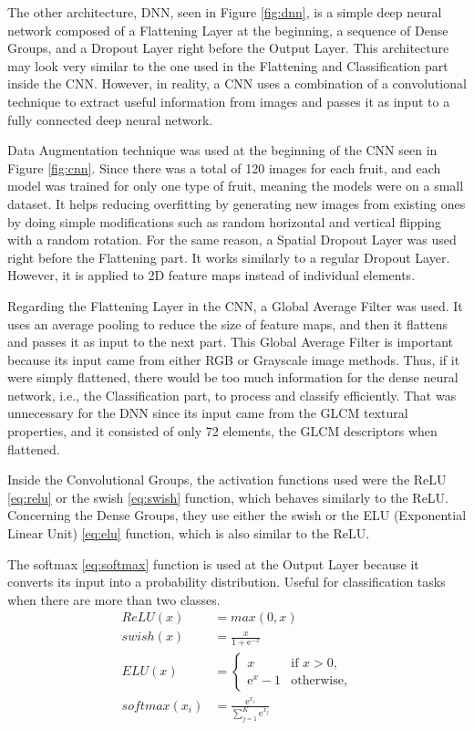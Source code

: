 \documentclass[../main.tex]{subfile}
\begin{document}
    
    
    The other architecture, DNN, seen in Figure \ref{fig:dnn}, is a simple deep neural network composed of a Flattening Layer at the beginning, a sequence of Dense Groups, and a Dropout Layer right before the Output Layer. This architecture may look very similar to the one used in the Flattening and Classification part inside the CNN. However, in reality, a CNN uses a combination of a convolutional technique to extract useful information from images and passes it as input to a fully connected deep neural network.
    
    Data Augmentation technique was used at the beginning of the CNN seen in Figure \ref{fig:cnn}. Since there was a total of 120 images for each fruit, and each model was trained for only one type of fruit, meaning the models were on a small dataset. It helps reducing overfitting by generating new images from existing ones by doing simple modifications such as random horizontal and vertical flipping with a random rotation. For the same reason, a Spatial Dropout Layer was used right before the Flattening part. It works similarly to a regular Dropout Layer. However, it is applied to 2D feature maps instead of individual elements.
    
    Regarding the Flattening Layer in the CNN, a Global Average Filter was used. It uses an average pooling to reduce the size of feature maps, and then it flattens and passes it as input to the next part. This Global Average Filter is important because its input came from either RGB or Grayscale image methods. Thus, if it were simply flattened, there would be too much information for the dense neural network, i.e., the Classification part, to process and classify efficiently. That was unnecessary for the DNN since its input came from the GLCM textural properties, and it consisted of only 72 elements, the GLCM descriptors when flattened.
    
    Inside the Convolutional Groups, the activation functions used were the ReLU \eqref{eq:relu} or the swish \eqref{eq:swish} function, which behaves similarly to the ReLU. Concerning the Dense Groups, they use either the swish or the ELU (Exponential Linear Unit) \eqref{eq:elu} function, which is also similar to the ReLU.

    The softmax \eqref{eq:softmax} function is used at the Output Layer because it converts its input into a probability distribution. Useful for classification tasks when there are more than two classes.
    \begin{align}
        ReLU(x) &= max(0, x) \label{eq:relu} \\
        swish(x) &= \frac{x}{1 + \mathrm{e}^{-x}} \label{eq:swish} \\
        ELU(x) &= 
        \begin{cases}
            x & \mbox{if } x > 0, \\
            \mathrm{e}^{x} - 1 & \mbox{otherwise},
        \end{cases} \label{eq:elu} \\
        softmax(x_{i}) &= \frac{\mathrm{e}^{x_{i}}}{\sum^{K}_{j=1} \mathrm{e}^{x_{j}}} \label{eq:softmax}
    \end{align}
\end{document}
